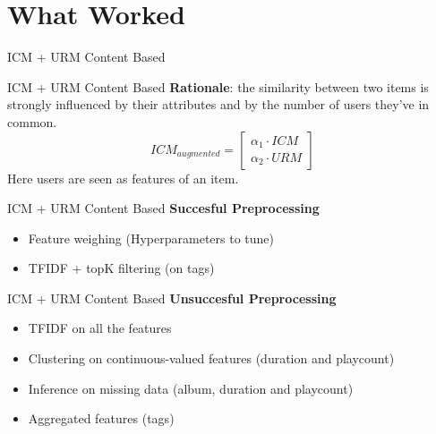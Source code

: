 \documentclass{beamer}
\begin{document}
  \section{What Worked}
  \begin{frame}[standout]
  ICM + URM Content Based
  \end{frame}
   \begin{frame}{ICM + URM Content Based}
   \textbf{Rationale}: the similarity between two items is strongly influenced by their attributes and by the number of users they've in common.
   $$
   ICM_{augmented}=
    \begin{bmatrix}
   \alpha_1\cdot ICM \\
   \alpha_2\cdot URM
   \end{bmatrix} 
   $$
   Here users are seen as features of an item.
   \end{frame}
   \begin{frame}{ICM + URM Content Based}
   \textbf{Succesful Preprocessing}
   \begin{itemize}
   \item Feature weighing (Hyperparameters to tune)
   \item TFIDF + topK filtering (on tags)
   \end{itemize}
   \end{frame}
   \begin{frame}{ICM + URM Content Based}
   \textbf{Unsuccesful Preprocessing}
   \begin{itemize}
   \item TFIDF on all the features
   \item Clustering on continuous-valued features (duration and playcount)
   \item Inference on missing data (album, duration and playcount)
   \item Aggregated features (tags) \footnotemark
   \end{itemize}
   \end{frame}
\end{document}
